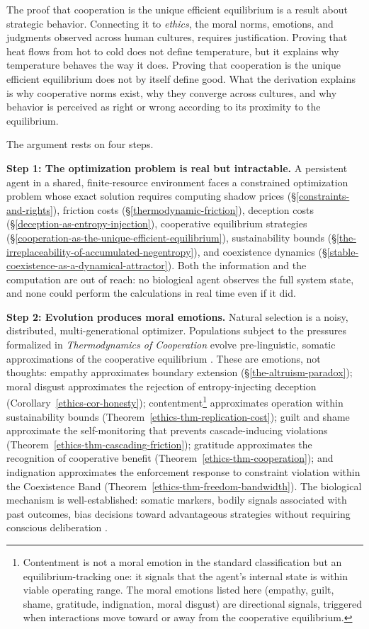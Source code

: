 \documentclass[11pt]{article}
\theoremstyle{plain}
\theoremstyle{definition}
\theoremstyle{remark}
\newcounter{none}
\begin{document}
The proof that cooperation is the unique efficient equilibrium is a
result about strategic behavior. Connecting it to \emph{ethics}, the
moral norms, emotions, and judgments observed across human cultures,
requires justification. Proving that heat flows from hot to cold does
not define temperature, but it explains why temperature behaves the way
it does. Proving that cooperation is the unique efficient equilibrium
does not by itself define good. What the derivation explains is why
cooperative norms exist, why they converge across cultures, and why
behavior is perceived as right or wrong according to its proximity to
the equilibrium.

The argument rests on four steps.

\textbf{Step 1: The optimization problem is real but intractable.} A
persistent agent in a shared, finite-resource environment faces a
constrained optimization problem whose exact solution requires computing
shadow prices (§\ref{constraints-and-rights}), friction costs
(§\ref{thermodynamic-friction}), deception costs
(§\ref{deception-as-entropy-injection}), cooperative equilibrium
strategies (§\ref{cooperation-as-the-unique-efficient-equilibrium}),
sustainability bounds
(§\ref{the-irreplaceability-of-accumulated-negentropy}), and coexistence
dynamics (§\ref{stable-coexistence-as-a-dynamical-attractor}). Both the
information and the computation are out of reach: no biological agent
observes the full system state, and none could perform the calculations
in real time even if it did.

\textbf{Step 2: Evolution produces moral emotions.} Natural selection is
a noisy, distributed, multi-generational optimizer. Populations subject
to the pressures formalized in \emph{Thermodynamics of Cooperation}
evolve pre-linguistic, somatic approximations of the cooperative
equilibrium
\citep{Gigerenzer1999, GigerenzerGaissmaier2011, Frank1988, Gigerenzer2010}.
These are emotions, not thoughts: empathy approximates boundary
extension (§\ref{the-altruism-paradox}); moral disgust approximates the
rejection of entropy-injecting deception
(Corollary~\ref{ethics-cor-honesty}); contentment\footnote{Contentment
  is not a moral emotion in the standard classification
  \citep{Haidt2003} but an equilibrium-tracking one: it signals that the
  agent's internal state is within viable operating range. The moral
  emotions listed here (empathy, guilt, shame, gratitude, indignation,
  moral disgust) are directional signals, triggered when interactions
  move toward or away from the cooperative equilibrium.} approximates
operation within sustainability bounds
(Theorem~\ref{ethics-thm-replication-cost}); guilt and shame approximate
the self-monitoring that prevents cascade-inducing violations
(Theorem~\ref{ethics-thm-cascading-friction}); gratitude approximates
the recognition of cooperative benefit
(Theorem~\ref{ethics-thm-cooperation}); and indignation approximates the
enforcement response to constraint violation within the Coexistence Band
(Theorem~\ref{ethics-thm-freedom-bandwidth}). The biological mechanism
is well-established: somatic markers, bodily signals associated with
past outcomes, bias decisions toward advantageous strategies without
requiring conscious deliberation
\citep{Damasio1994, Bechara1997, BechaDamasio2005}.
\end{document}
